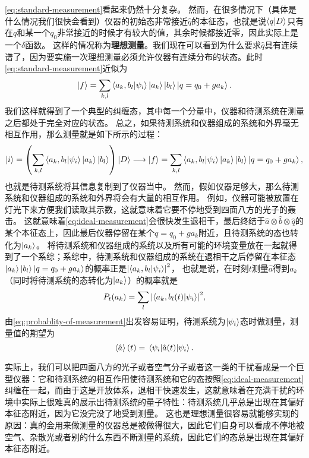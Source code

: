 \documentclass[hyperref, UTF8, a4paper]{ctexart}
\begin{document}
\eqref{eq:standard-measurement}看起来仍然十分复杂。
然而，在很多情况下（具体是什么情况我们很快会看到）仪器的初始态非常接近$\hat{q}$的本征态，也就是说$\braket{q}{D}$只有在$q$和某一个$q_0$非常接近的时候才有较大的值，其余时候都接近零，因此实际上是一个$\delta$函数。
这样的情况称为\textbf{理想测量}。我们现在可以看到为什么要求$\hat{q}$具有连续谱了，因为要实施一次理想测量必须允许仪器有连续分布的状态。此时\eqref{eq:standard-measurement}近似为
\begin{equation}
    \ket{f} = \sum_{k, l} \braket{a_k, b_l}{\psi_i} \ket{a_k} \ket{b_l} \ket{q = q_0 + g a_k}.
    \label{eq:ideal-measurement}
\end{equation}
我们这样就得到了一个典型的纠缠态，其中每一个分量中，仪器和待测系统在测量之后都处于完全对应的状态。
总之，如果待测系统和仪器组成的系统和外界毫无相互作用，那么测量就是如下所示的过程：
\[
    \ket{i} = \left(\sum_{k, l} \braket{a_k, b_l}{\psi_i} \ket{a_k} \ket{b_l} \right) \ket{D} \longrightarrow \ket{f} = \sum_{k, l} \braket{a_k, b_l}{\psi_i} \ket{a_k} \ket{b_l} \ket{q = q_0 + g a_k},
\]
也就是待测系统将其信息复制到了仪器当中。
然而，假如仪器足够大，那么待测系统和仪器组成的系统和外界将会有大量的相互作用。
例如，仪器可能被放置在灯光下来方便我们读取其示数，这就意味着它要不停地受到四面八方的光子的轰击。
这就意味着\eqref{eq:ideal-measurement}会很快发生退相干，最后终结于$\hat{a} \otimes \hat{b} \otimes \hat{q}$的某个本征态上，因此最后仪器停留在某个$q=q_0 + g a_k$附近，且待测系统的态也转化为$\ket{a_k}$。
将待测系统和仪器组成的系统以及所有可能的环境变量放在一起就得到了一个系综；系综中，待测系统和仪器组成的系统在退相干之后停留在本征态$\ket{a_k} \ket{b_l} \ket{q = q_0 + g a_k}$的概率正是$\abs{\braket{a_k, b_l}{\psi_i}}^2$，
也就是说，在时刻$t$测量$\hat{a}$得到$a_k$（同时将待测系统的态转化为$\ket{a_k}$）的概率就是
\begin{equation}
    P_t(a_k) = \sum_l \abs{\braket{a_k, b_l(t)}{\psi_i}}^2,
    \label{eq:probablity-of-measurement}
\end{equation}
由\eqref{eq:probablity-of-measurement}出发容易证明，待测系统为$\ket{\psi_i}$态时做测量，测量值的期望为
\begin{equation}
    \expval{\hat{a}}(t) = \mel{\psi_i}{\hat{a}(t)}{\psi_i}.
\end{equation}

实际上，我们可以把四面八方的光子或者空气分子或者这一类的干扰看成是一个巨型仪器：它和待测系统的相互作用使待测系统和它的态按照\eqref{eq:ideal-measurement}纠缠在一起，而由于这是开放体系，退相干快速发生，这就意味着在充满干扰的环境中实际上很难真的展示出待测系统的量子特性：待测系统几乎总是出现在其偏好本征态附近，因为它没完没了地受到测量。
这也是理想测量很容易就能够实现的原因：真的会用来做测量的仪器总是被做得很大，因此它们自身可以看成不停地被空气、杂散光或者别的什么东西不断测量的系统，因此它们的态总是出现在其偏好本征态附近。
\end{document}
